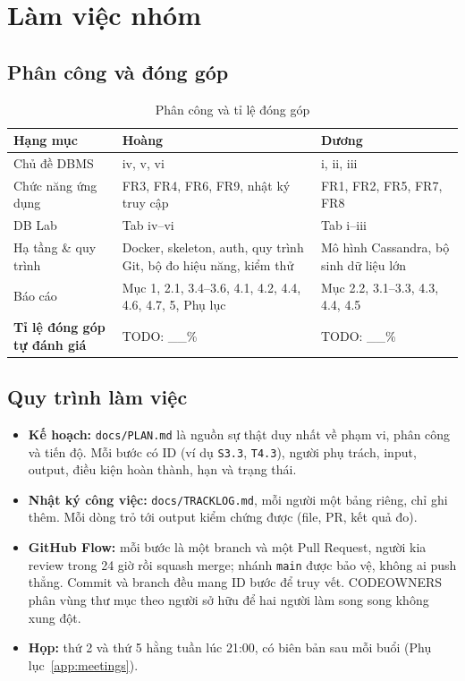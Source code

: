 \section{Làm việc nhóm}
\label{sec:teamwork}

\subsection{Phân công và đóng góp}

\begin{table}[H]
\centering
\caption{Phân công và tỉ lệ đóng góp}
\label{tab:contrib}
\begin{tabularx}{\linewidth}{|p{3.2cm}|X|X|}
\hline
\textbf{Hạng mục} & \textbf{Hoàng} & \textbf{Dương} \\ \hline
Chủ đề DBMS & iv, v, vi & i, ii, iii \\ \hline
Chức năng ứng dụng & FR3, FR4, FR6, FR9, nhật ký truy cập & FR1, FR2, FR5, FR7, FR8 \\ \hline
DB Lab & Tab iv--vi & Tab i--iii \\ \hline
Hạ tầng \& quy trình & Docker, skeleton, auth, quy trình Git, bộ đo hiệu năng, kiểm thử & Mô hình Cassandra, bộ sinh dữ liệu lớn \\ \hline
Báo cáo & Mục 1, 2.1, 3.4--3.6, 4.1, 4.2, 4.4, 4.6, 4.7, 5, Phụ lục & Mục 2.2, 3.1--3.3, 4.3, 4.4, 4.5 \\ \hline
\textbf{Tỉ lệ đóng góp tự đánh giá} & \colorbox{yellow!40}{TODO: \_\_\%} & \colorbox{yellow!40}{TODO: \_\_\%} \\ \hline
\end{tabularx}
\end{table}

\subsection{Quy trình làm việc}
\begin{itemize}
    \item \textbf{Kế hoạch:} \texttt{docs/PLAN.md} là nguồn sự thật duy nhất về phạm vi, phân công và tiến độ. Mỗi bước có ID (ví dụ \texttt{S3.3}, \texttt{T4.3}), người phụ trách, input, output, điều kiện hoàn thành, hạn và trạng thái.
    \item \textbf{Nhật ký công việc:} \texttt{docs/TRACKLOG.md}, mỗi người một bảng riêng, chỉ ghi thêm. Mỗi dòng trỏ tới output kiểm chứng được (file, PR, kết quả đo).
    \item \textbf{GitHub Flow:} mỗi bước là một branch và một Pull Request, người kia review trong 24 giờ rồi squash merge; nhánh \texttt{main} được bảo vệ, không ai push thẳng. Commit và branch đều mang ID bước để truy vết. CODEOWNERS phân vùng thư mục theo người sở hữu để hai người làm song song không xung đột.
    \item \textbf{Họp:} thứ 2 và thứ 5 hằng tuần lúc 21:00, có biên bản sau mỗi buổi (Phụ lục~\ref{app:meetings}).
\end{itemize}


